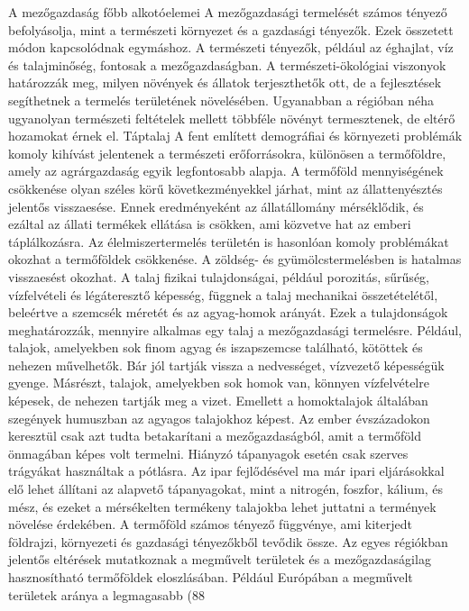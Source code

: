 \documentclass[a4paper,oneside,onecolumn,12pt]{LegrandOrangeBook}
\begin{document}
A mezőgazdaság főbb alkotóelemei
A mezőgazdasági termelését számos tényező befolyásolja, mint a természeti környezet és a gazdasági tényezők. Ezek összetett módon kapcsolódnak egymáshoz. A természeti tényezők, például az éghajlat, víz és talajminőség, fontosak a mezőgazdaságban. A természeti-ökológiai viszonyok határozzák meg, milyen növények és állatok terjeszthetők ott, de a fejlesztések segíthetnek a termelés területének növelésében. Ugyanabban a régióban néha ugyanolyan természeti feltételek mellett többféle növényt termesztenek, de eltérő hozamokat érnek el.
Táptalaj
A fent említett demográfiai és környezeti problémák komoly kihívást jelentenek a természeti erőforrásokra, különösen a termőföldre, amely az agrárgazdaság egyik legfontosabb alapja. A termőföld mennyiségének csökkenése olyan széles körű következményekkel járhat, mint az állattenyésztés jelentős visszaesése. Ennek eredményeként az állatállomány mérséklődik, és ezáltal az állati termékek ellátása is csökken, ami közvetve hat az emberi táplálkozásra. Az élelmiszertermelés területén is hasonlóan komoly problémákat okozhat a termőföldek csökkenése. A zöldség- és gyümölcstermelésben is hatalmas visszaesést okozhat.
A talaj fizikai tulajdonságai, például porozitás, sűrűség, vízfelvételi és légáteresztő képesség, függnek a talaj mechanikai összetételétől, beleértve a szemcsék méretét és az agyag-homok arányát. Ezek a tulajdonságok meghatározzák, mennyire alkalmas egy talaj a mezőgazdasági termelésre. Például, talajok, amelyekben sok finom agyag és iszapszemcse található, kötöttek és nehezen művelhetők. Bár jól tartják vissza a nedvességet, vízvezető képességük gyenge. Másrészt, talajok, amelyekben sok homok van, könnyen vízfelvételre képesek, de nehezen tartják meg a vizet. Emellett a homoktalajok általában szegények humuszban az agyagos talajokhoz képest.
Az ember évszázadokon keresztül csak azt tudta betakarítani a mezőgazdaságból, amit a termőföld önmagában képes volt termelni. Hiányzó tápanyagok esetén csak szerves trágyákat használtak a pótlásra. Az ipar fejlődésével ma már ipari eljárásokkal elő lehet állítani az alapvető tápanyagokat, mint a nitrogén, foszfor, kálium, és mész, és ezeket a mérsékelten termékeny talajokba lehet juttatni a termények növelése érdekében.
A termőföld számos tényező függvénye, ami kiterjedt földrajzi, környezeti és gazdasági tényezőkből tevődik össze. Az egyes régiókban jelentős eltérések mutatkoznak a megművelt területek és a mezőgazdaságilag hasznosítható termőföldek eloszlásában. Például Európában a megművelt területek aránya a legmagasabb (88%
\end{document}
